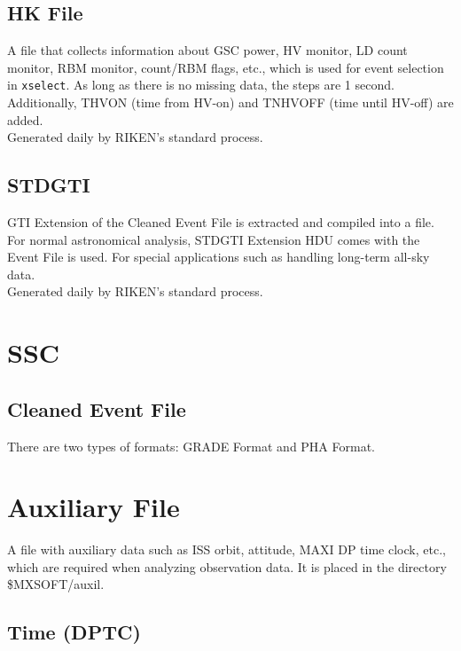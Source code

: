 \documentclass[10pt]{report}
\renewcommand{\_}{\textscale{.5}{\textbf{\textunderscore}}}
\begin{document}
\subsection{HK File}\label{subsec:2.1.5}

A file that collects information about GSC power, HV monitor, LD count monitor, RBM monitor, count/RBM flags, etc., which is used for event selection in \texttt{xselect}. As long as there is no missing data, the steps are 1 second. \\
\indent Additionally, T\_HV\_ON (time from HV-on) and TN\_HV\_OFF (time until HV-off) are added. \\
\indent Generated daily by RIKEN's standard process. \\

\subsection{STDGTI}\label{subsec:2.1.6}

GTI Extension of the Cleaned Event File is extracted and compiled into a file. For normal astronomical analysis, STDGTI Extension HDU comes with the Event File is used. For special applications such as handling long-term all-sky data. \\
\indent Generated daily by RIKEN's standard process. \\

\section{SSC}\label{sec:2.2}


\subsection{Cleaned Event File}\label{subsec:2.2.1}

There are two types of formats: GRADE Format and PHA Format. \\

\section{Auxiliary File}\label{sec:2.3}

A file with auxiliary data such as ISS orbit, attitude, MAXI DP time clock, etc., which are required when analyzing observation data. It is placed in the directory \$MXSOFT/auxil. \\

\subsection{Time (DPTC)}\label{subsec:2.3.1}
\end{document}

